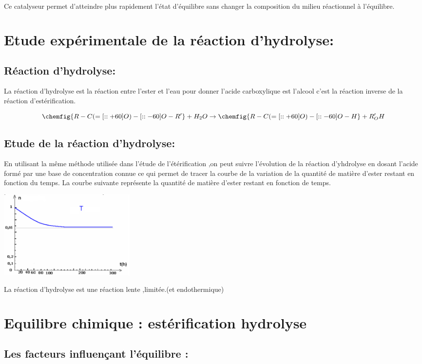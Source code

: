 \documentclass[12pt]{article}
\begin{document}
Ce catalyseur permet d'atteindre plus rapidement l'état d'équilibre sans changer la composition du milieu réactionnel à l'équilibre.

\section{Etude expérimentale de la réaction d'hydrolyse:}
\subsection{Réaction d’hydrolyse:}
La réaction d'hydrolyse est la réaction entre l'ester et l'eau pour donner l'acide carboxylique est l'alcool c'est la réaction inverse
de la réaction d'estérification.

$$\chemfig{R-C(=[::+60]O)-[::-60]O-R'} + H_2O \rightarrow \chemfig{R-C(=[::+60]O)-[::-60]O-H} + R'_OH$$

\subsection{Etude de la réaction d'hydrolyse:}
En utilisant la même méthode utilisée dans l'étude de l'étérification ,on peut suivre l'évolution de la réaction d'yhdrolyse
en dosant l'acide formé par une base de concentration connue ce qui permet de tracer la courbe de la variation de la quantité de
matière d'ester restant en fonction du temps.
La courbe suivante représente la quantité de matière d'ester restant en fonction de temps.


\begin{center}
	\includegraphics[width=0.3\textwidth]{./img/img02.png}
\end{center}

\begin{tcolorbox}
La réaction d'hydrolyse est une réaction lente ,limitée.(et endothermique)
\end{tcolorbox}

\section{Equilibre chimique : estérification hydrolyse}
\subsection{Les facteurs influençant l'équilibre : }
\end{document}
